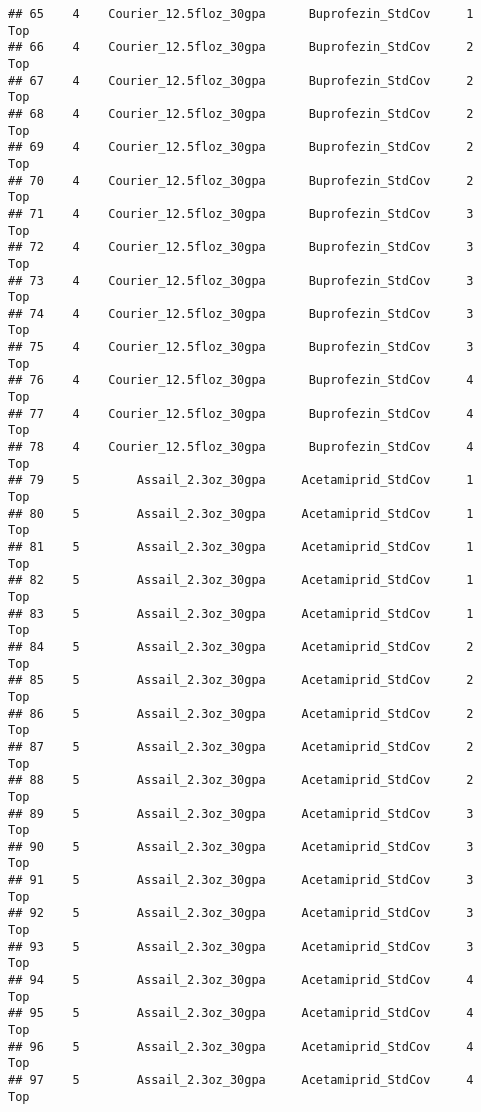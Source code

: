 \documentclass[
]{article}
\begin{document}
\begin{verbatim}
## 65    4    Courier_12.5floz_30gpa      Buprofezin_StdCov     1           Top
## 66    4    Courier_12.5floz_30gpa      Buprofezin_StdCov     2           Top
## 67    4    Courier_12.5floz_30gpa      Buprofezin_StdCov     2           Top
## 68    4    Courier_12.5floz_30gpa      Buprofezin_StdCov     2           Top
## 69    4    Courier_12.5floz_30gpa      Buprofezin_StdCov     2           Top
## 70    4    Courier_12.5floz_30gpa      Buprofezin_StdCov     2           Top
## 71    4    Courier_12.5floz_30gpa      Buprofezin_StdCov     3           Top
## 72    4    Courier_12.5floz_30gpa      Buprofezin_StdCov     3           Top
## 73    4    Courier_12.5floz_30gpa      Buprofezin_StdCov     3           Top
## 74    4    Courier_12.5floz_30gpa      Buprofezin_StdCov     3           Top
## 75    4    Courier_12.5floz_30gpa      Buprofezin_StdCov     3           Top
## 76    4    Courier_12.5floz_30gpa      Buprofezin_StdCov     4           Top
## 77    4    Courier_12.5floz_30gpa      Buprofezin_StdCov     4           Top
## 78    4    Courier_12.5floz_30gpa      Buprofezin_StdCov     4           Top
## 79    5        Assail_2.3oz_30gpa     Acetamiprid_StdCov     1           Top
## 80    5        Assail_2.3oz_30gpa     Acetamiprid_StdCov     1           Top
## 81    5        Assail_2.3oz_30gpa     Acetamiprid_StdCov     1           Top
## 82    5        Assail_2.3oz_30gpa     Acetamiprid_StdCov     1           Top
## 83    5        Assail_2.3oz_30gpa     Acetamiprid_StdCov     1           Top
## 84    5        Assail_2.3oz_30gpa     Acetamiprid_StdCov     2           Top
## 85    5        Assail_2.3oz_30gpa     Acetamiprid_StdCov     2           Top
## 86    5        Assail_2.3oz_30gpa     Acetamiprid_StdCov     2           Top
## 87    5        Assail_2.3oz_30gpa     Acetamiprid_StdCov     2           Top
## 88    5        Assail_2.3oz_30gpa     Acetamiprid_StdCov     2           Top
## 89    5        Assail_2.3oz_30gpa     Acetamiprid_StdCov     3           Top
## 90    5        Assail_2.3oz_30gpa     Acetamiprid_StdCov     3           Top
## 91    5        Assail_2.3oz_30gpa     Acetamiprid_StdCov     3           Top
## 92    5        Assail_2.3oz_30gpa     Acetamiprid_StdCov     3           Top
## 93    5        Assail_2.3oz_30gpa     Acetamiprid_StdCov     3           Top
## 94    5        Assail_2.3oz_30gpa     Acetamiprid_StdCov     4           Top
## 95    5        Assail_2.3oz_30gpa     Acetamiprid_StdCov     4           Top
## 96    5        Assail_2.3oz_30gpa     Acetamiprid_StdCov     4           Top
## 97    5        Assail_2.3oz_30gpa     Acetamiprid_StdCov     4           Top

\end{verbatim}
\end{document}
